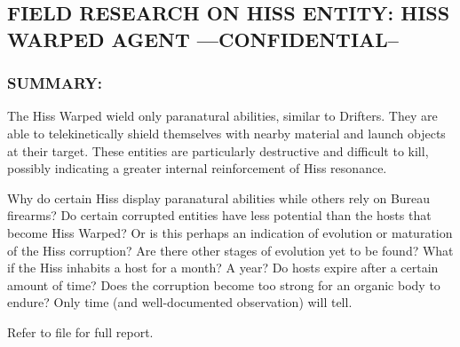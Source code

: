 \subsection*{FIELD RESEARCH ON HISS ENTITY:
	HISS WARPED AGENT
	—CONFIDENTIAL--}
\subsubsection*{SUMMARY:}
\par The Hiss Warped wield only paranatural
abilities, similar to Drifters. They are able
to telekinetically shield themselves with
nearby material and launch objects at
their target. These entities are
particularly destructive and difficult to kill,
possibly indicating a greater internal reinforcement of Hiss
resonance.
\par Why do certain Hiss display paranatural abilities while others rely
on Bureau firearms? Do certain corrupted entities have less
potential than the hosts that become Hiss Warped? Or is this
perhaps an indication of evolution or maturation of the Hiss
corruption? Are there other stages of evolution yet to be found?
What if the Hiss inhabits a host for a month? A year? Do hosts
expire after a certain amount of time? Does the corruption
become too strong for an organic body to endure? Only time (and
well-documented observation) will tell.
\par Refer to file  for full report.